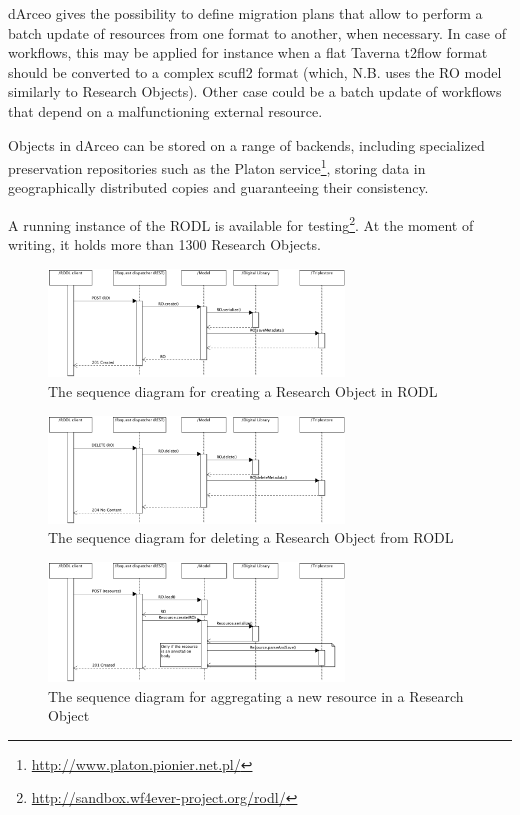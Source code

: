 dArceo gives the possibility to define migration plans that allow to perform a batch update of resources from one format to another, when necessary. In case of workflows, this may be applied for instance when a flat Taverna t2flow format should be converted to a complex scufl2 format (which, N.B. uses the RO model similarly to Research Objects). Other case could be a batch update of workflows that depend on a malfunctioning external resource.

Objects in dArceo can be stored on a range of backends, including specialized preservation repositories such as the Platon service\footnote{\url{http://www.platon.pionier.net.pl/}}, storing data in geographically distributed copies and guaranteeing their consistency.

A running instance of the RODL is available for testing\footnote{\url{http://sandbox.wf4ever-project.org/rodl/}}. At the moment of writing, it holds more than 1300 Research Objects.


\begin{figure}[!hb]
\centering
\includegraphics[width=0.7\textwidth]{Figures/RODL/ROcreate.png}
\caption{The sequence diagram for creating a Research Object in RODL}
\label{ROCreate}
\end{figure}

\begin{figure}[!hb]
\centering
\includegraphics[width=0.7\textwidth]{Figures/RODL/ROdelete.png}
\caption{The sequence diagram for deleting a Research Object from RODL}
\label{RODelete}
\end{figure}

\begin{figure}[!hb]
\centering
\includegraphics[width=0.7\textwidth]{Figures/RODL/ResourceAdd.png}
\caption{The sequence diagram for aggregating a new resource in a Research Object}
\label{ResourceAdd}
\end{figure}

